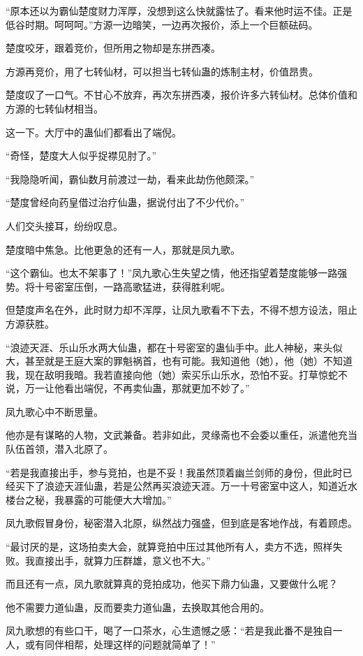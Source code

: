 \begin{this_body}
“原本还以为霸仙楚度财力浑厚，没想到这么快就露怯了。看来他时运不佳。正是低谷时期。呵呵呵。”方源一边暗笑，一边再次报价，添上一个巨额砝码。

楚度咬牙，跟着竞价，但所用之物却是东拼西凑。

方源再竞价，用了七转仙材，可以担当七转仙蛊的炼制主材，价值昂贵。

楚度叹了一口气。不甘心不放弃，再次东拼西凑，报价许多六转仙材。总体价值和方源的七转仙材相当。

这一下。大厅中的蛊仙们都看出了端倪。

“奇怪，楚度大人似乎捉襟见肘了。”

“我隐隐听闻，霸仙数月前渡过一劫，看来此劫伤他颇深。”

“楚度曾经向药皇借过治疗仙蛊，据说付出了不少代价。”

人们交头接耳，纷纷叹息。

楚度暗中焦急。比他更急的还有一人，那就是凤九歌。

“这个霸仙。也太不架事了！”凤九歌心生失望之情，他还指望着楚度能够一路强势。将十号密室压倒，一路高歌猛进，获得胜利呢。

但楚度声名在外，此时财力却不浑厚，让凤九歌看不下去，不得不想方设法，阻止方源获胜。

“浪迹天涯、乐山乐水两大仙蛊，都在十号密室的蛊仙手中。此人神秘，来头似大，甚至就是王庭大案的罪魁祸首，也有可能。我知道他（她），他（她）不知道我，现在敌明我暗。我若直接向他（她）索买乐山乐水，恐怕不妥。打草惊蛇不说，万一让他看出端倪，不再卖仙蛊，那就更加不妙了。”

凤九歌心中不断思量。

他亦是有谋略的人物，文武兼备。若非如此，灵缘斋也不会委以重任，派遣他充当队伍首领，潜入北原了。

“若是我直接出手，参与竞拍，也是不妥！我虽然顶着幽兰剑师的身份，但此时已经买下了浪迹天涯仙蛊，若是公然再买浪迹天涯。万一十号密室中这人，知道近水楼台之秘，我暴露的可能便大大增加。”

凤九歌假冒身份，秘密潜入北原，纵然战力强盛，但到底是客地作战，有着顾虑。

“最讨厌的是，这场拍卖大会，就算竞拍中压过其他所有人，卖方不选，照样失败。我直接出手，就算力压群雄，意义也不大。”

而且还有一点，凤九歌就算真的竞拍成功，他买下鼎力仙蛊，又要做什么呢？

他不需要力道仙蛊，反而要卖力道仙蛊，去换取其他合用的。

凤九歌想的有些口干，喝了一口茶水，心生遗憾之感：“若是我此番不是独自一人，或有同伴相帮，处理这样的问题就简单了！”


\end{this_body}
